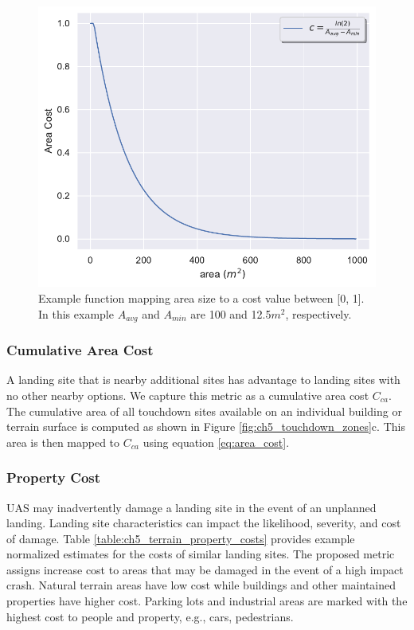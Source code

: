 \begin{figure}[ht]
    \centering
    \includegraphics[clip, trim=0.2cm 0cm 0cm 0cm, width=0.5\linewidth]{chapter_5_mapping/imgs/area_cost.pdf}
    \caption[Mapping area size to risk]{Example function mapping area size to a cost value between [0, 1]. In this example $A_{avg}$ and $A_{min}$ are 100 and 12.5$m^2$, respectively. }
    \label{fig:ch5_ny_area_cost}
\end{figure}


\subsubsection{Cumulative Area Cost}
A landing site that is nearby additional sites has advantage to landing sites with no other nearby options. 
We capture this metric as a cumulative area cost $C_{ca}$.  The cumulative area of all touchdown sites available on an individual building or terrain surface is computed as shown in Figure \ref{fig:ch5_touchdown_zones}c.  This area is then mapped to $C_{ca}$ using equation \ref{eq:area_cost}.

\subsubsection{Property Cost}\label{sec:ch5_property_cost}
UAS may inadvertently damage a landing site in the event of an unplanned landing. Landing site characteristics can impact the likelihood, severity, and cost of damage. Table \ref{table:ch5_terrain_property_costs} provides example normalized estimates for the costs of similar landing sites. The proposed metric assigns increase cost to areas that may be damaged in the event of a high impact crash. Natural terrain areas have low cost while buildings and other maintained properties have higher cost. Parking lots and industrial areas are marked with the highest cost to people and property, e.g., cars, pedestrians. %

